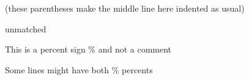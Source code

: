 \documentclass{article}
\begin{document}
(these parentheses
  make the middle line here
indented as usual)


unmatched %

This is a percent sign \% and not a comment

Some lines might have both \% percents %
\end{document}
